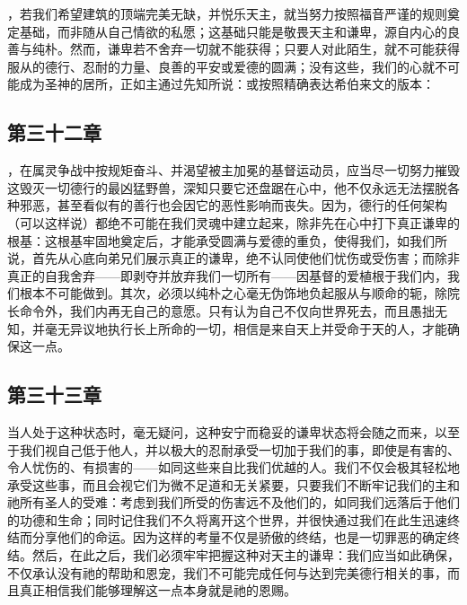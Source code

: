 \par

，若我们希望建筑的顶端完美无缺，并悦乐天主，就当努力按照福音严谨的规则奠定基础，而非随从自己情欲的私愿；这基础只能是敬畏天主和谦卑，源自内心的良善与纯朴。然而，谦卑若不舍弃一切就不能获得；只要人对此陌生，就不可能获得服从的德行、忍耐的力量、良善的平安或爱德的圆满；没有这些，我们的心就不可能成为圣神的居所，正如主通过先知所说：或按照精确表达希伯来文的版本：\par


\subsection{第三十二章}

\par

，在属灵争战中按规矩奋斗、并渴望被主加冕的基督运动员，应当尽一切努力摧毁这毁灭一切德行的最凶猛野兽，深知只要它还盘踞在心中，他不仅永远无法摆脱各种邪恶，甚至看似有的善行也会因它的恶性影响而丧失。因为，德行的任何架构（可以这样说）都绝不可能在我们灵魂中建立起来，除非先在心中打下真正谦卑的根基：这根基牢固地奠定后，才能承受圆满与爱德的重负，使得我们，如我们所说，首先从心底向弟兄们展示真正的谦卑，绝不认同使他们忧伤或受伤害；而除非真正的自我舍弃——即剥夺并放弃我们一切所有——因基督的爱植根于我们内，我们根本不可能做到。其次，必须以纯朴之心毫无伪饰地负起服从与顺命的轭，除院长命令外，我们内再无自己的意愿。只有认为自己不仅向世界死去，而且愚拙无知，并毫无异议地执行长上所命的一切，相信是来自天上并受命于天的人，才能确保这一点。\par


\subsection{第三十三章}

\par

当人处于这种状态时，毫无疑问，这种安宁而稳妥的谦卑状态将会随之而来，以至于我们视自己低于他人，并以极大的忍耐承受一切加于我们的事，即使是有害的、令人忧伤的、有损害的——如同这些来自比我们优越的人。我们不仅会极其轻松地承受这些事，而且会视它们为微不足道和无关紧要，只要我们不断牢记我们的主和祂所有圣人的受难：考虑到我们所受的伤害远不及他们的，如同我们远落后于他们的功德和生命；同时记住我们不久将离开这个世界，并很快通过我们在此生迅速终结而分享他们的命运。因为这样的考量不仅是骄傲的终结，也是一切罪恶的确定终结。然后，在此之后，我们必须牢牢把握这种对天主的谦卑：我们应当如此确保，不仅承认没有祂的帮助和恩宠，我们不可能完成任何与达到完美德行相关的事，而且真正相信我们能够理解这一点本身就是祂的恩赐。\par

